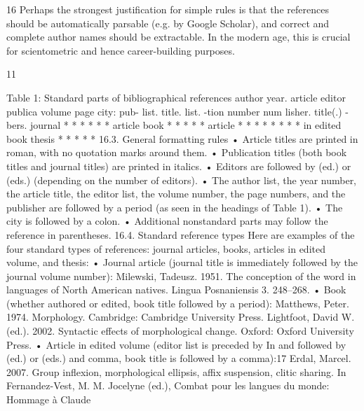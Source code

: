  	
 	
 	
 	
 	
 	
 	
 	
 	
 	
 	
 	
 	
 	
 	
 	
 	
 	
 	
 	
 	
 	
 	
 	
	
 
16
 Perhaps the strongest justification for simple rules is that the references should be automatically
parsable (e.g. by Google Scholar), and correct and complete author names should be extractable. In the
modern age, this is crucial for scientometric and hence career-building purposes.
	
 
 11	
  
Table 1: Standard parts of bibliographical references
author
 year.
 article
 editor
 publica
 volume
 page
 city:
 pub-
list.
 title.
 list.
 -tion
 number
 num
 lisher.
title(.)
 -bers.
journal
 *
 *
 *
 *
 *
 *
article
book
 *
 *
 *
 *
 *
article
 *
 *
 *
 *
 *
 *
 *
 *
in edited
book
thesis
 *
 *
 *
 *
 *
16.3. General formatting rules
• Article titles are printed in roman, with no quotation marks around them.
• Publication titles (both book titles and journal titles) are printed in italics.
• Editors are followed by (ed.) or (eds.) (depending on the number of editors).
• The author list, the year number, the article title, the editor list, the volume number,
the page numbers, and the publisher are followed by a period (as seen in the headings
of Table 1).
• The city is followed by a colon.
• Additional nonstandard parts may follow the reference in parentheses.
16.4. Standard reference types
Here are examples of the four standard types of references: journal articles, books, articles
in edited volume, and thesis:
• Journal article (journal title is immediately followed by the journal volume number):
Milewski, Tadeusz. 1951. The conception of the word in languages of North American natives.
Lingua Posnaniensis 3. 248–268.
• Book (whether authored or edited, book title followed by a period):
Matthews, Peter. 1974. Morphology. Cambridge: Cambridge University Press.
Lightfoot, David W. (ed.). 2002. Syntactic effects of morphological change. Oxford: Oxford University
Press.
• Article in edited volume (editor list is preceded by In and followed by (ed.) or (eds.)
and comma, book title is followed by a comma):17
Erdal, Marcel. 2007. Group inflexion, morphological ellipsis, affix suspension, clitic sharing. In
Fernandez-Vest, M. M. Jocelyne (ed.), Combat pour les langues du monde: Hommage à Claude
	
